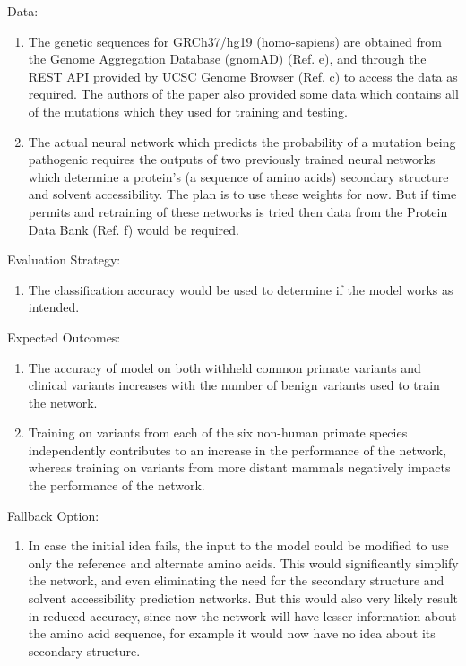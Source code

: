 \documentclass[twoside]{article}
\begin{document}
\begin{enumerate}
	 Data:
     \begin{enumerate}     
     \item The genetic sequences for GRCh37/hg19 (homo-sapiens) are obtained from the Genome Aggregation Database (gnomAD) (Ref. e), and through the REST API provided by UCSC Genome Browser (Ref. c) to access the data as required. The authors of the paper also provided some data which contains all of the mutations which they used for training and testing.
     \item The actual neural network which predicts the probability of a mutation being pathogenic requires the outputs of two previously trained neural networks which determine a protein's (a sequence of amino acids) secondary structure and solvent accessibility. The plan is to use these weights for now. But if time permits and retraining of these networks is tried then data from the Protein Data Bank (Ref. f) would be required.
     \end{enumerate}
\pagebreak
 	 Evaluation Strategy:
 	 \begin{enumerate}
 	 	\item The classification accuracy would be used to determine if the model works as intended.
 	 \end{enumerate}
  
  	 Expected Outcomes:
  	 \begin{enumerate}
  	 	\item The accuracy of model on both withheld common primate variants and clinical variants increases with the number of benign variants used to train the network.
  	 	\item Training on variants from each of the six non-human primate species independently contributes to an increase in the performance of the network, whereas training on variants from more distant mammals negatively impacts the performance of the network.
  	 \end{enumerate}
   
   	 Fallback Option:
   	 \begin{enumerate}
   	 	\item In case the initial idea fails, the input to the model could be modified to use only the reference and alternate amino acids. This would significantly simplify the network, and even eliminating the need for the secondary structure and solvent accessibility prediction networks. But this would also very likely result in reduced accuracy, since now the network will have lesser information about the amino acid sequence, for example it would now have no idea about its secondary structure.
   	 \end{enumerate}


\end{enumerate}
\end{document}
